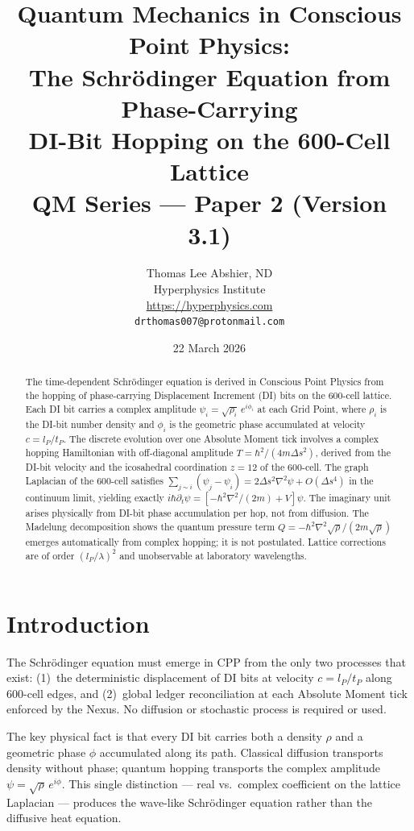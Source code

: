 \documentclass[11pt,a4paper]{article}
\title{\textbf{Quantum Mechanics in Conscious Point Physics:\\
The Schr\"{o}dinger Equation from Phase-Carrying\\
DI-Bit Hopping on the 600-Cell Lattice}\\[6pt]
{\large QM Series --- Paper 2 (Version 3.1)}}
\author{Thomas Lee Abshier, ND\\
Hyperphysics Institute\\
\url{https://hyperphysics.com}\\
\texttt{drthomas007@protonmail.com}}
\date{22 March 2026}
\newcommand{\lP}{l_P}
\newcommand{\tP}{t_P}
\begin{document}
\maketitle

\begin{abstract}
The time-dependent Schr\"{o}dinger equation is derived in Conscious
Point Physics from the hopping of phase-carrying Displacement Increment
(DI) bits on the 600-cell lattice.  Each DI bit carries a complex
amplitude $\psi_i = \sqrt{\rho_i}\,e^{i\phi_i}$ at each Grid Point,
where $\rho_i$ is the DI-bit number density and $\phi_i$ is the
geometric phase accumulated at velocity $c = \lP/\tP$.  The discrete
evolution over one Absolute Moment tick involves a complex hopping
Hamiltonian with off-diagonal amplitude $T = \hbar^2/(4m\Delta s^2)$,
derived from the DI-bit velocity and the icosahedral coordination
$z=12$ of the 600-cell.  The graph Laplacian of the 600-cell satisfies
$\sum_{j\sim i}(\psi_j - \psi_i) = 2\Delta s^2\nabla^2\psi + O(\Delta
s^4)$ in the continuum limit, yielding exactly
$i\hbar\partial_t\psi = [-\hbar^2\nabla^2/(2m) + V]\psi$.
The imaginary unit arises physically from DI-bit phase accumulation
per hop, not from diffusion.  The Madelung decomposition shows the
quantum pressure term $Q = -\hbar^2\nabla^2\!\sqrt{\rho}/(2m\sqrt{\rho})$
emerges automatically from complex hopping; it is not postulated.
Lattice corrections are of order $(\lP/\lambda)^2$ and unobservable at
laboratory wavelengths.
\end{abstract}

\tableofcontents
\newpage

\section{Introduction}

The Schr\"{o}dinger equation must emerge in CPP from the only two
processes that exist: (1)~the deterministic displacement of DI bits at
velocity $c = \lP/\tP$ along 600-cell edges, and (2)~global ledger
reconciliation at each Absolute Moment tick enforced by the Nexus.
No diffusion or stochastic process is required or used.

The key physical fact is that every DI bit carries both a density
$\rho$ and a geometric phase $\phi$ accumulated along its path.
Classical diffusion transports density without phase; quantum hopping
transports the complex amplitude $\psi = \sqrt{\rho}\,e^{i\phi}$.
This single distinction --- real vs.\ complex coefficient on the
lattice Laplacian --- produces the wave-like Schr\"{o}dinger equation
rather than the diffusive heat equation.
\end{document}
